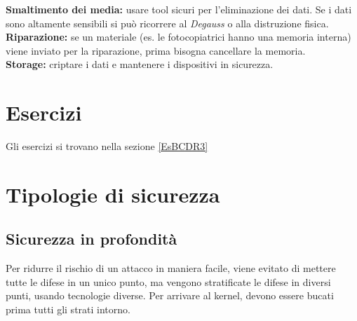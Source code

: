 \textbf{Smaltimento dei media:} usare tool sicuri per l'eliminazione dei dati. Se i dati 
sono altamente sensibili si può ricorrere al \textit{Degauss} o alla distruzione 
fisica.\\
\newline 
\textbf{Riparazione:} se un materiale (es. le fotocopiatrici hanno una memoria 
interna) viene inviato per la riparazione, prima bisogna cancellare la memoria.\\
\newline
\textbf{Storage:} criptare i dati e mantenere i dispositivi in sicurezza.

\section{Esercizi}

Gli esercizi si trovano nella sezione \ref{EsBCDR3}

\section{Tipologie di sicurezza}

\subsection{Sicurezza in profondità}

Per ridurre il rischio di un attacco in maniera facile, viene evitato di
mettere tutte le difese in un unico punto, ma vengono stratificate le difese in
diversi punti, usando tecnologie diverse.
Per arrivare al kernel, devono essere bucati prima tutti gli strati intorno.
